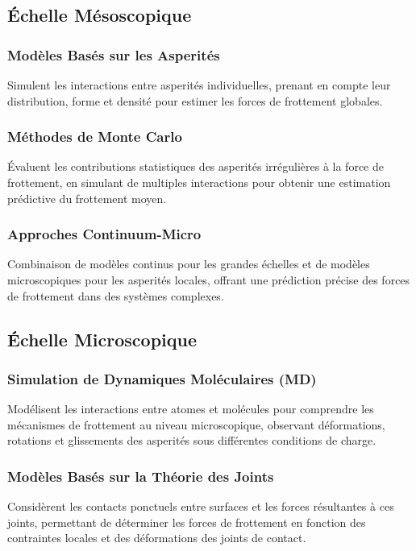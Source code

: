 \subsection{Échelle Mésoscopique}
\label{subsec:mesoscopique}

\subsubsection{Modèles Basés sur les Asperités}
Simulent les interactions entre asperités individuelles, prenant en compte leur distribution, forme et densité pour estimer les forces de frottement globales.

\subsubsection{Méthodes de Monte Carlo}
Évaluent les contributions statistiques des asperités irrégulières à la force de frottement, en simulant de multiples interactions pour obtenir une estimation prédictive du frottement moyen.

\subsubsection{Approches Continuum-Micro}
Combinaison de modèles continus pour les grandes échelles et de modèles microscopiques pour les asperités locales, offrant une prédiction précise des forces de frottement dans des systèmes complexes.

\subsection{Échelle Microscopique}
\label{subsec:microscopique}

\subsubsection{Simulation de Dynamiques Moléculaires (MD)}
Modélisent les interactions entre atomes et molécules pour comprendre les mécanismes de frottement au niveau microscopique, observant déformations, rotations et glissements des asperités sous différentes conditions de charge.

\subsubsection{Modèles Basés sur la Théorie des Joints}
Considèrent les contacts ponctuels entre surfaces et les forces résultantes à ces joints, permettant de déterminer les forces de frottement en fonction des contraintes locales et des déformations des joints de contact.

